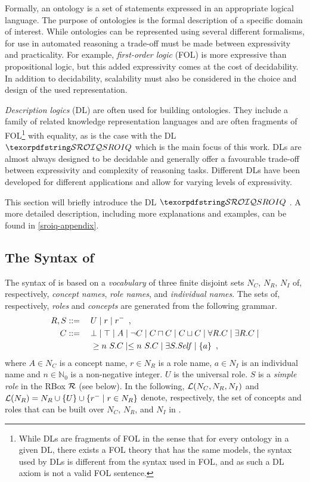 Formally, an ontology is a set of statements expressed in an appropriate logical language. The purpose of ontologies is the formal description of a specific domain of interest. While ontologies can be represented using several different formalisms, for use in automated reasoning a trade-off must be made between expressivity and practicality. For example, \emph{first-order logic} (FOL) is more expressive than propositional logic, but this added expressivity comes at the cost of decidability. In addition to decidability, scalability must also be considered in the choice and design of the used representation.

\emph{Description logics} (DL) are often used for building ontologies. They include a family of related knowledge representation languages and are often fragments of FOL\footnote{While DLs are fragments of FOL in the sense that for every ontology in a given DL, there exists a FOL theory that has the same models, the syntax used by DLs is different from the syntax used in FOL, and as such a DL axiom is not a valid FOL sentence.} with equality, as is the case with the DL $\SROIQ$ which is the main focus of this work. DLs are almost always designed to be decidable and generally offer a favourable trade-off between expressivity and complexity of reasoning tasks. Different DLs have been developed for different applications and allow for varying levels of expressivity.

This section will briefly introduce the DL $\SROIQ$ \cite{horrocks2006even,rudolph2011foundations,baader_horrocks_lutz_sattler_2017}. A more detailed description, including more explanations and examples, can be found in \cref{sroiq-appendix}.

\subsection{The Syntax of \SROIQ} \label{sroiq-syntax}

The syntax of \SROIQ is based on a \emph{vocabulary} of three finite disjoint sets $N_C$, $N_R$, $N_I$ of, respectively, \emph{concept names}, \emph{role names}, and \emph{individual names}. The sets of, respectively, \SROIQ  \emph{roles} and \SROIQ \emph{concepts} are generated from the following grammar.
\begin{alignat*}{2}
  R, S &::={} && U \mid r \mid r^{-} \enspace,\\
  C &::= && \bot \mid \top \mid A \mid \neg C \mid C \sqcap C \mid C \sqcup C \mid \forall R.C \mid \exists R.C \mid \\ 
  &&& \geq n~S.C \mid \leq n~S.C \mid \exists S.\mathit{Self} \mid \{a\} \enspace,
\end{alignat*}
where $A \in N_C$ is a concept name, $r \in N_R$ is a role name, $a \in N_I$ is an individual name and $n \in \mathbb{N}_0$ is a non-negative integer. 
%
$U$ is the universal role. $S$ is a \emph{simple role} in the RBox $\mathcal{R}$ (see below). In the following, $\mathcal{L}(N_C, N_R, N_I)$ and $\mathcal{L}(N_R) = N_R \cup \{U\} \cup \{r^- \mid r \in N_R\}$ denote, respectively, the set of concepts and roles that can be built over $N_C$, $N_R$, and $N_I$ in \SROIQ.

